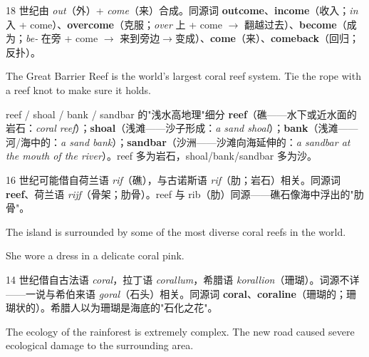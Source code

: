 \documentclass[../main.tex]{subfiles}
\begin{document}
\begin{origin}
18 世纪由 \textit{out}（外）+ \textit{come}（来）合成。同源词 \textbf{outcome}、\textbf{income}（收入；\textit{in} 入 + come）、\textbf{overcome}（克服；\textit{over} 上 + come $\to$ 翻越过去）、\textbf{become}（成为；\textit{be-} 在旁 + come $\to$ 来到旁边$\to$变成）、\textbf{come}（来）、\textbf{comeback}（回归；反扑）。
\end{origin}


{The Great Barrier Reef is the world's largest coral reef system.}
{Tie the rope with a reef knot to make sure it holds.}

\begin{gram}{reef / shoal / bank / sandbar 的"浅水高地理"细分}
\textbf{reef}（礁——水下或近水面的岩石：\textit{coral reef}）；\textbf{shoal}（浅滩——沙子形成：\textit{a sand shoal}）；\textbf{bank}（浅滩——河/海中的：\textit{a sand bank}）；\textbf{sandbar}（沙洲——沙滩向海延伸的：\textit{a sandbar at the mouth of the river}）。reef 多为岩石，shoal/bank/sandbar 多为沙。
\end{gram}

\begin{origin}
16 世纪可能借自荷兰语 \textit{rif}（礁），与古诺斯语 \textit{rif}（肋；岩石）相关。同源词 \textbf{reef}、荷兰语 \textit{rijf}（骨架；肋骨）。reef 与 rib（肋）同源——礁石像海中浮出的"肋骨"。
\end{origin}


{The island is surrounded by some of the most diverse coral reefs in the world.}

{She wore a dress in a delicate coral pink.}

\begin{origin}
14 世纪借自古法语 \textit{coral}，拉丁语 \textit{corallum}，希腊语 \textit{korallion}（珊瑚）。词源不详——一说与希伯来语 \textit{goral}（石头）相关。同源词 \textbf{coral}、\textbf{coraline}（珊瑚的；珊瑚状的）。希腊人以为珊瑚是海底的"石化之花"。
\end{origin}


{The ecology of the rainforest is extremely complex.}
{The new road caused severe ecological damage to the surrounding area.}
\end{document}
